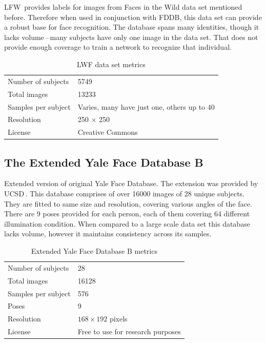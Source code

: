 LFW\,\cite{lfw} provides labels for images from Faces in the Wild data set mentioned before. Therefore when used in conjunction with FDDB, this data set can provide a robust base for face recognition. The database spans many identities, though it lacks volume\,--\,many subjects have only one image in the data set. That does not provide enough coverage to train a network to recognize that individual.

\begin{table}[ht]
    \centering
    \caption{LWF data set metrics}

    \begin{tabularx}{.8\textwidth}{l|X}
        \toprule
        Number of subjects & \num{5749} \\
        Total images & \num{13233} \\
        Samples per subject & Varies, many have just one, others up to 40 \\
        Resolution & 250 $\times$ 250 \\
        License & Creative Commons \\
        \bottomrule
    \end{tabularx}
\end{table}

\subsection{The Extended Yale Face Database B}

Extended version of original Yale Face Database. The extension was provided by UCSD\,\cite{ext_yale_paper}. This database comprises of over \num{16000} images of 28 unique subjects. They are fitted to same size and resolution, covering various angles of the face. There are 9 poses provided for each person, each of them covering 64 different illumination condition. When compared to a large scale data set this database lacks volume, however it maintains consistency across its samples.

\begin{table}[ht]
    \centering
    \caption{Extended Yale Face Database B metrics}

    \begin{tabularx}{.8\textwidth}{l|X}
        \toprule
        Number of subjects & 28 \\
        Total images & \num{16128} \\
        Samples per subject & 576 \\
        Poses & 9 \\
        Resolution & $168 \times 192$ pixels \\
        License & Free to use for research purposes\\
        \bottomrule
    \end{tabularx}
\end{table}

